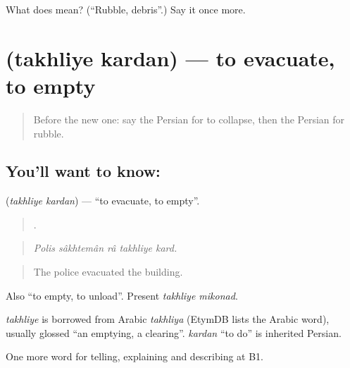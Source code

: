 \begin{tcolorbox}[breakable,colback=teal!4,colframe=teal!35!black,title={Before you move on}]
What does  mean? (\textquotedblleft{}Rubble, debris\textquotedblright{}.) Say it once more.
\end{tcolorbox}
\section[\texorpdfstring{\fa{تخلیه} \fa{کردن} (takhliye kardan)}{تخلیه کردن (takhliye kardan)}]{  (takhliye kardan) — to evacuate, to empty}

\label{lesson:FA-C331-takhliye-kardan}



\begin{quote}
Before the new one: say the Persian for to collapse, then the Persian for rubble.
\end{quote}

\subsection*{You'll want to know:  }
\textbf{ } (\emph{takhliye kardan}) — \textquotedblleft{}to evacuate, to empty\textquotedblright{}.

\begin{quote}
    .
\end{quote}

\begin{quote}
\emph{Polis sâkhtemân râ takhliye kard.}
\end{quote}

\begin{quote}
The police evacuated the building.
\end{quote}

Also \textquotedblleft{}to empty, to unload\textquotedblright{}. Present \emph{takhliye mikonad}.

\begin{cousinweb}
\emph{takhliye} is borrowed from Arabic \emph{takhliya} (EtymDB lists the Arabic word), usually glossed \textquotedblleft{}an emptying, a clearing\textquotedblright{}. \emph{kardan} \textquotedblleft{}to do\textquotedblright{} is inherited Persian.
\end{cousinweb}

\begin{grammarlens}[title={What you've built}]
One more word for telling, explaining and describing at B1.
\end{grammarlens}

